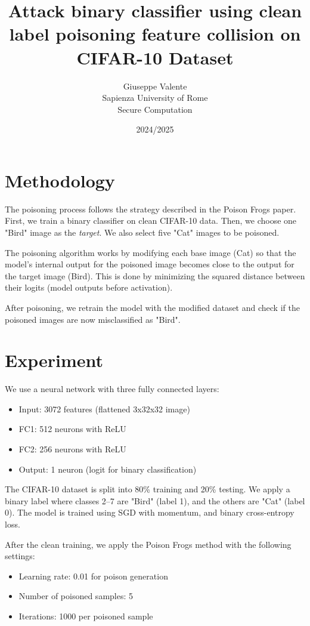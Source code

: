 \documentclass{article}
\author{Giuseppe Valente \\ Sapienza University of Rome \\ Secure Computation\\}
\date{2024/2025}
\title{Attack binary classifier using clean label poisoning feature collision on CIFAR-10 Dataset\\}
\begin{document}
\maketitle

\newpage

\tableofcontents

\newpage








\section{Methodology}
The poisoning process follows the strategy described in the Poison Frogs paper. First, we train a binary classifier on clean CIFAR-10 data. Then, we choose one "Bird" image as the \textit{target}. We also select five "Cat" images to be poisoned.

The poisoning algorithm works by modifying each base image (Cat) so that the model’s internal output for the poisoned image becomes close to the output for the target image (Bird). This is done by minimizing the squared distance between their logits (model outputs before activation).

After poisoning, we retrain the model with the modified dataset and check if the poisoned images are now misclassified as "Bird".

\section{Experiment}
We use a neural network with three fully connected layers:
\begin{itemize}
    \item Input: 3072 features (flattened 3x32x32 image)
    \item FC1: 512 neurons with ReLU
    \item FC2: 256 neurons with ReLU
    \item Output: 1 neuron (logit for binary classification)
\end{itemize}

The CIFAR-10 dataset is split into 80\% training and 20\% testing. We apply a binary label where classes 2--7 are "Bird" (label 1), and the others are "Cat" (label 0). The model is trained using SGD with momentum, and binary cross-entropy loss.

After the clean training, we apply the Poison Frogs method with the following settings:
\begin{itemize}
    \item Learning rate: 0.01 for poison generation
    \item Number of poisoned samples: 5
    \item Iterations: 1000 per poisoned sample
\end{itemize}
\end{document}
